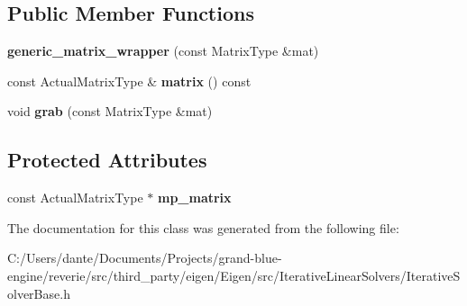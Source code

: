 \subsection*{Public Member Functions}
\begin{DoxyCompactItemize}
\item 
\mbox{\label{class_eigen_1_1internal_1_1generic__matrix__wrapper_3_01_matrix_type_00_01true_01_4_ac89e601d01930231ae620e0a7b0e6a1e}} 
{\bfseries generic\+\_\+matrix\+\_\+wrapper} (const Matrix\+Type \&mat)
\item 
\mbox{\label{class_eigen_1_1internal_1_1generic__matrix__wrapper_3_01_matrix_type_00_01true_01_4_a69a8b188c188a3ff0b8722e4223675a3}} 
const Actual\+Matrix\+Type \& {\bfseries matrix} () const
\item 
\mbox{\label{class_eigen_1_1internal_1_1generic__matrix__wrapper_3_01_matrix_type_00_01true_01_4_a8f32de9dda1d5f851f63aaea19018433}} 
void {\bfseries grab} (const Matrix\+Type \&mat)
\end{DoxyCompactItemize}
\subsection*{Protected Attributes}
\begin{DoxyCompactItemize}
\item 
\mbox{\label{class_eigen_1_1internal_1_1generic__matrix__wrapper_3_01_matrix_type_00_01true_01_4_aec147002b2e3bb3426638eb75e778494}} 
const Actual\+Matrix\+Type $\ast$ {\bfseries mp\+\_\+matrix}
\end{DoxyCompactItemize}


The documentation for this class was generated from the following file\+:\begin{DoxyCompactItemize}
\item 
C\+:/\+Users/dante/\+Documents/\+Projects/grand-\/blue-\/engine/reverie/src/third\+\_\+party/eigen/\+Eigen/src/\+Iterative\+Linear\+Solvers/Iterative\+Solver\+Base.\+h\end{DoxyCompactItemize}
